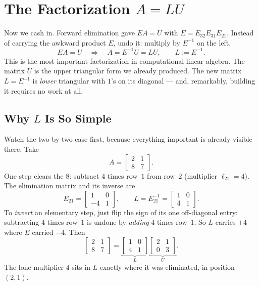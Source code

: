 \section{The Factorization $A = LU$}
\label{sec:ch2-LU}

Now we cash in. Forward elimination gave $EA=U$ with $E=E_{32}E_{31}E_{21}$. Instead of carrying the awkward product $E$, undo it: multiply by $E^{-1}$ on the left,
\[
EA=U \quad\Longrightarrow\quad A=E^{-1}U=LU,
\qquad L:=E^{-1}.
\]
This is the most important factorization in computational linear algebra. The matrix $U$ is the upper triangular form we already produced. The new matrix $L=E^{-1}$ is \emph{lower} triangular with $1$'s on its diagonal --- and, remarkably, building it requires no work at all.

\subsection{Why $L$ Is So Simple}

Watch the two-by-two case first, because everything important is already visible there. Take
\[
A=\begin{bmatrix} 2 & 1\\ 8 & 7\end{bmatrix}.
\]
One step clears the $8$: subtract $4$ times row~$1$ from row~$2$ (multiplier $\ell_{21}=4$). The elimination matrix and its inverse are
\[
E_{21}=\begin{bmatrix} 1 & 0\\ -4 & 1\end{bmatrix},
\qquad
L=E_{21}^{-1}=\begin{bmatrix} 1 & 0\\ 4 & 1\end{bmatrix}.
\]
To \emph{invert} an elementary step, just flip the sign of its one off-diagonal entry: subtracting $4$ times row~$1$ is undone by \emph{adding} $4$ times row~$1$. So $L$ carries $+4$ where $E$ carried $-4$. Then
\[
\begin{bmatrix} 2 & 1\\ 8 & 7\end{bmatrix}
=\underbrace{\begin{bmatrix} 1 & 0\\ 4 & 1\end{bmatrix}}_{L}
\underbrace{\begin{bmatrix} 2 & 1\\ 0 & 3\end{bmatrix}}_{U}.
\]
The lone multiplier $4$ sits in $L$ exactly where it was eliminated, in position $(2,1)$.

